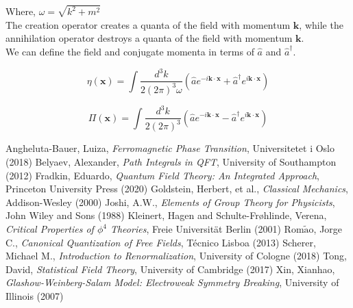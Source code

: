 \documentclass[12pt]{report}
\begin{document}
\begin{appendices}
\noindent Where, $\omega=\sqrt{k^2+m^2}$\\

\noindent The creation operator creates a quanta of the field with momentum $\boldsymbol{k}$, while the annihilation operator destroys a quanta of the field with momentum $\boldsymbol{k}$.\\

\noindent We can define the field and conjugate momenta in terms of $\hat{a}$ and $\hat{a}^\dagger$.

$$\eta(\boldsymbol{x})=\int\frac{d^3k}{2(2\pi)^3\omega}(\hat{a}e^{-i\boldsymbol{k}\cdot\boldsymbol{x}}+\hat{a}^\dagger e^{i\boldsymbol{k}\cdot\boldsymbol{x}})$$

$$\Pi(\boldsymbol{x})=\int\frac{d^3k}{2(2\pi)^3}(\hat{a}e^{-i\boldsymbol{k}\cdot\boldsymbol{x}}-\hat{a}^\dagger e^{i\boldsymbol{k}\cdot\boldsymbol{x}})$$

\end{appendices}

\begin{thebibliography}{10}
    \bibitem{} Angheluta-Bauer, Luiza, \emph{Ferromagnetic Phase Transition}, Universitetet i Oslo (2018)
    \bibitem{} Belyaev, Alexander, \emph{Path Integrals in QFT}, University of Southampton (2012)
    \bibitem{} Fradkin, Eduardo, \emph{Quantum Field Theory: An Integrated Approach}, Princeton University Press (2020)
    \bibitem{} Goldstein, Herbert, et al., \emph{Classical Mechanics}, Addison-Wesley (2000)
    \bibitem{} Joshi, A.W., \emph{Elements of Group Theory for Physicists}, John Wiley and Sons (1988)
    \bibitem{} Kleinert, Hagen and Schulte-Fr\o hlinde, Verena, \emph{Critical Properties of $\phi^4$ Theories}, Freie Universit\"at Berlin (2001)
    \bibitem{} Rom$\tilde{\text{a}}$o, Jorge C., \emph{Canonical Quantization of Free Fields}, T\'ecnico Lisboa (2013)
    \bibitem{} Scherer, Michael M., \emph{Introduction to Renormalization}, University of Cologne (2018)
    \bibitem{} Tong, David, \emph{Statistical Field Theory}, University of Cambridge (2017)
    \bibitem{} Xin, Xianhao, \emph{Glashow-Weinberg-Salam Model: Electroweak Symmetry Breaking}, University of Illinois (2007)
\end{thebibliography}
\end{document}
